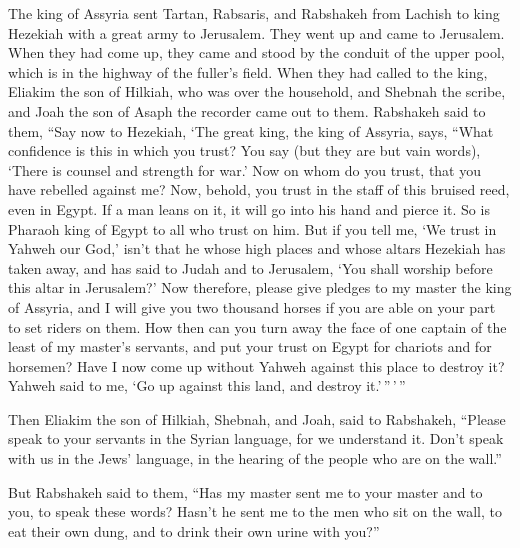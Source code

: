  The king of Assyria sent Tartan, Rabsaris, and Rabshakeh
from Lachish to king Hezekiah with a great army to Jerusalem. They went
up and came to Jerusalem. When they had come up, they came and stood by
the conduit of the upper pool, which is in the highway of the fuller's
field.  When they had called to the king, Eliakim the son
of Hilkiah, who was over the household, and Shebnah the scribe, and Joah
the son of Asaph the recorder came out to them.  Rabshakeh
said to them, ``Say now to Hezekiah, `The great king, the king of
Assyria, says, ``What confidence is this in which you trust?
 You say (but they are but vain words), `There is counsel
and strength for war.' Now on whom do you trust, that you have rebelled
against me?  Now, behold, you trust in the staff of this
bruised reed, even in Egypt. If a man leans on it, it will go into his
hand and pierce it. So is Pharaoh king of Egypt to all who trust on him.
 But if you tell me, `We trust in Yahweh our God,' isn't
that he whose high places and whose altars Hezekiah has taken away, and
has said to Judah and to Jerusalem, `You shall worship before this altar
in Jerusalem?'  Now therefore, please give pledges to my
master the king of Assyria, and I will give you two thousand horses if
you are able on your part to set riders on them.  How then
can you turn away the face of one captain of the least of my master's
servants, and put your trust on Egypt for chariots and for horsemen?
 Have I now come up without Yahweh against this place to
destroy it? Yahweh said to me, `Go up against this land, and destroy
it.'\,''\,'\,''

 Then Eliakim the son of Hilkiah, Shebnah, and Joah, said
to Rabshakeh, ``Please speak to your servants in the Syrian language,
for we understand it. Don't speak with us in the Jews' language, in the
hearing of the people who are on the wall.''

 But Rabshakeh said to them, ``Has my master sent me to
your master and to you, to speak these words? Hasn't he sent me to the
men who sit on the wall, to eat their own dung, and to drink their own
urine with you?''

